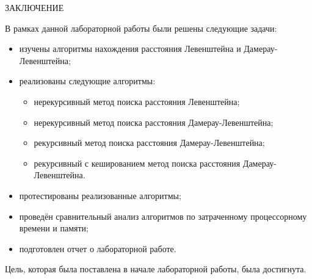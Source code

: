 \begin{center}
	ЗАКЛЮЧЕНИЕ
\end{center}

В рамках данной лабораторной работы были решены следующие задачи:

\begin{itemize}
	\item изучены алгоритмы нахождения расстояния Левенштейна и Дамерау-Левенштейна;
	\item реализованы следующие алгоритмы:
	\begin{itemize}[label=---]
		\item нерекурсивный метод поиска расстояния Левенштейна;
		\item нерекурсивный метод поиска расстояния Дамерау-Левенштейна;
		\item рекурсивный метод поиска расстояния Дамерау-Левенштейна;
		\item рекурсивный с кешированием метод поиска расстояния Дамерау-Левенштейна.
	\end{itemize}
	\item протестированы реализованные алгоритмы;
	\item проведён сравнительный анализ алгоритмов по затраченному процессорному времени и памяти;
	\item подготовлен отчет о лабораторной работе.
\end{itemize}

Цель, которая была поставлена в начале лабораторной работы, была достигнута.